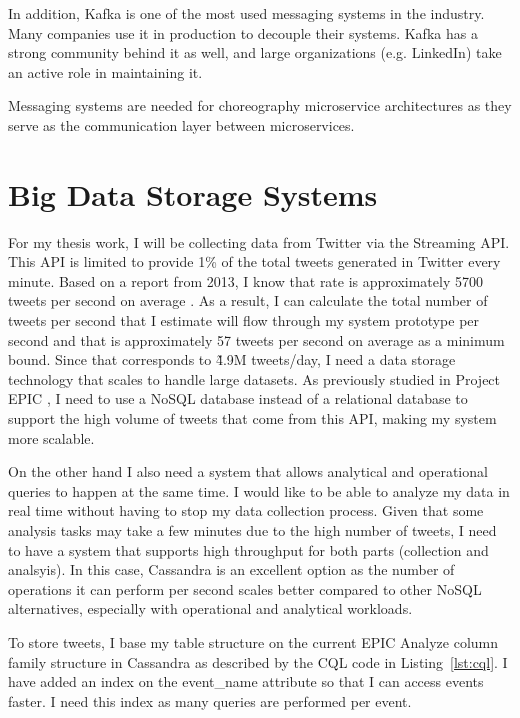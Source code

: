 In addition, Kafka is one of the most used messaging systems in the industry. Many companies use it in production to decouple their systems. Kafka has a strong community behind it as well, and large organizations (e.g. LinkedIn) take an active role in maintaining it.

Messaging systems are needed for choreography microservice architectures as they serve as the communication layer between microservices.

\section{Big Data Storage Systems}

For my thesis work, I  will be collecting data from Twitter via the Streaming API. This API is limited to provide 1\% of the total tweets generated in Twitter every minute. Based on a report from 2013, I know that rate is approximately 5700 tweets per second on average \parencite{tweetsRecord}. As a result, I can calculate the total number of tweets per second that I estimate will flow through my system prototype per second and that is approximately 57 tweets per second on average as a minimum bound. Since that corresponds to \~4.9M tweets/day, I need a data storage technology that scales to handle large datasets. As previously studied in Project EPIC \parencite{oopsla12}, I need to use a NoSQL database instead of a relational database to support the high volume of tweets that come from this API, making my system more scalable.

On the other hand I also need a system that allows analytical and operational queries to happen at the same time. I would like to be able to analyze my data in real time without having to stop my data collection process. Given that some analysis tasks may take a few minutes due to the high number of tweets, I need to have a system that supports high throughput for both parts (collection and analsyis). In this case, Cassandra is an excellent option as the number of operations it can perform per second scales better compared to other NoSQL alternatives, especially with operational and analytical workloads.\parencite{benchmarkNoSQL}

To store tweets, I base my table structure on the current EPIC Analyze column family structure in Cassandra as described by the CQL code in Listing~\ref{lst:cql}. I have added an index on the event\_name attribute so that I can access events faster. I need this index as many queries are performed per event.

